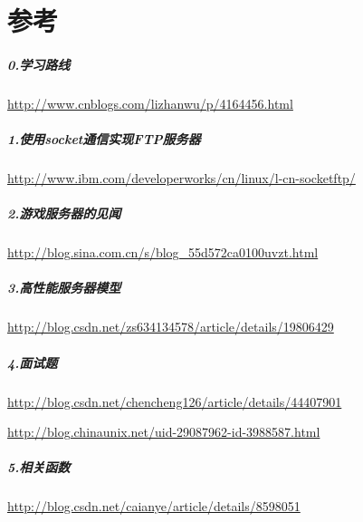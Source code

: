 \documentclass[UTF8,a4paper,12pt]{ctexbook}
\begin{document}
\section{参考}
    \subparagraph{0.学习路线}\url{http://www.cnblogs.com/lizhanwu/p/4164456.html}
	\subparagraph{1.使用socket通信实现FTP服务器}\url{http://www.ibm.com/developerworks/cn/linux/l-cn-socketftp/}
	\subparagraph{2.游戏服务器的见闻}\url{http://blog.sina.com.cn/s/blog_55d572ca0100uvzt.html}
	\subparagraph{3.高性能服务器模型}\url{http://blog.csdn.net/zs634134578/article/details/19806429}
	\subparagraph{4.面试题} \url{http://blog.csdn.net/chencheng126/article/details/44407901}
	
		\url{http://blog.chinaunix.net/uid-29087962-id-3988587.html}
	
	\subparagraph{5.相关函数} \url{http://blog.csdn.net/caianye/article/details/8598051}
\end{document}

